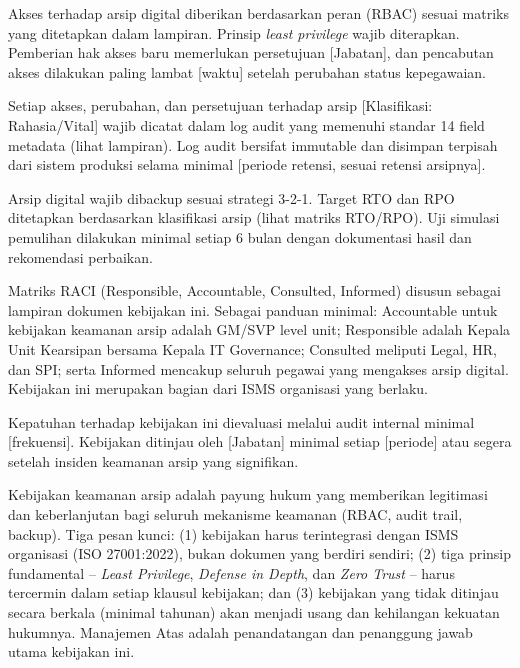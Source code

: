 \documentclass[12pt,a4paper]{report}
\begin{document}
\begin{plnbox}
Akses terhadap arsip digital diberikan berdasarkan peran (RBAC) sesuai matriks yang ditetapkan dalam lampiran. Prinsip \textit{least privilege} wajib diterapkan. Pemberian hak akses baru memerlukan persetujuan [Jabatan], dan pencabutan akses dilakukan paling lambat [waktu] setelah perubahan status kepegawaian.
\end{plnbox}

\begin{plnbox}
Setiap akses, perubahan, dan persetujuan terhadap arsip [Klasifikasi: Rahasia/Vital] wajib dicatat dalam log audit yang memenuhi standar 14 field metadata (lihat lampiran). Log audit bersifat immutable dan disimpan terpisah dari sistem produksi selama minimal [periode retensi, sesuai retensi arsipnya].
\end{plnbox}

\begin{plnbox}
Arsip digital wajib dibackup sesuai strategi 3-2-1. Target RTO dan RPO ditetapkan berdasarkan klasifikasi arsip (lihat matriks RTO/RPO). Uji simulasi pemulihan dilakukan minimal setiap 6 bulan dengan dokumentasi hasil dan rekomendasi perbaikan.
\end{plnbox}

\begin{plnbox}
Matriks RACI (Responsible, Accountable, Consulted, Informed) disusun sebagai lampiran dokumen kebijakan ini. Sebagai panduan minimal: Accountable untuk kebijakan keamanan arsip adalah GM/SVP level unit; Responsible adalah Kepala Unit Kearsipan bersama Kepala IT Governance; Consulted meliputi Legal, HR, dan SPI; serta Informed mencakup seluruh pegawai yang mengakses arsip digital. Kebijakan ini merupakan bagian dari ISMS organisasi yang berlaku.
\end{plnbox}

\begin{plnbox}
Kepatuhan terhadap kebijakan ini dievaluasi melalui audit internal minimal [frekuensi]. Kebijakan ditinjau oleh [Jabatan] minimal setiap [periode] atau segera setelah insiden keamanan arsip yang signifikan.
\end{plnbox}

\begin{plnbox}
Kebijakan keamanan arsip adalah payung hukum yang memberikan legitimasi dan keberlanjutan bagi seluruh mekanisme keamanan (RBAC, audit trail, backup). Tiga pesan kunci: (1) kebijakan harus terintegrasi dengan ISMS organisasi (ISO 27001:2022), bukan dokumen yang berdiri sendiri; (2) tiga prinsip fundamental -- \textit{Least Privilege}, \textit{Defense in Depth}, dan \textit{Zero Trust} -- harus tercermin dalam setiap klausul kebijakan; dan (3) kebijakan yang tidak ditinjau secara berkala (minimal tahunan) akan menjadi usang dan kehilangan kekuatan hukumnya. Manajemen Atas adalah penandatangan dan penanggung jawab utama kebijakan ini.
\end{plnbox}
\end{document}
